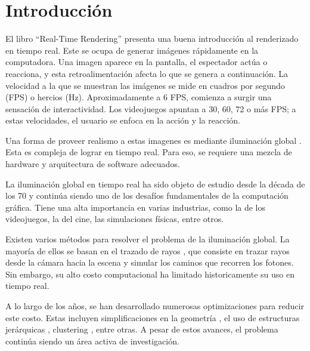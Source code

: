 \chapter{Introducción}


El libro ``Real-Time Rendering'' \cite[p.~1]{rtr} presenta una buena introducción al renderizado en tiempo real.
Este se ocupa de generar imágenes rápidamente en la computadora.
Una imagen aparece en la pantalla, el espectador actúa o reacciona, y esta retroalimentación afecta lo que se genera a continuación.
La velocidad a la que se muestran las imágenes se mide en cuadros por segundo (FPS) o hercios (Hz).
Aproximadamente a 6 FPS, comienza a surgir una sensación de interactividad.
Los videojuegos apuntan a 30, 60, 72 o más FPS; a estas velocidades, el usuario se enfoca en la acción y la reacción.

Una forma de proveer realismo a estas imagenes es mediante iluminación global \cite[p.~437]{rtr}.
Esta es compleja de lograr en tiempo real.
Para eso, se requiere una mezcla de hardware y arquitectura de software adecuados.

La iluminación global en tiempo real ha sido objeto de estudio desde la década de los 70 y continúa siendo uno de los desafíos fundamentales de la computación gráfica.
Tiene una alta importancia en varias industrias, como la de los videojuegos, la del cine, las simulaciones físicas, entre otros.

Existen varios métodos para resolver el problema de la iluminación global.
La mayoría de ellos se basan en el trazado de rayos \cite{whitted-1980}, que consiste en trazar rayos desde la cámara hacia la escena y simular los caminos que recorren los fotones.
Sin embargo, su alto costo computacional ha limitado historicamente su uso en tiempo real.

A lo largo de los años, se han desarrollado numerosas optimizaciones para reducir este costo.
Estas incluyen simplificaciones en la geometría \cite{gigavoxels}, el uso de estructuras jerárquicas \cite{real-time-photon-mapping}, clustering \cite{faster-photon-mapping}, entre otras.
A pesar de estos avances, el problema continúa siendo un área activa de investigación.

